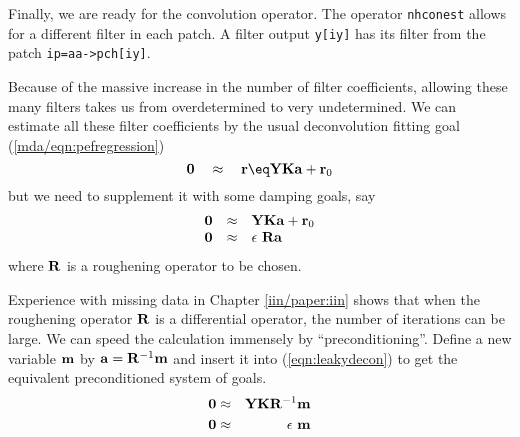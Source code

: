 \par
Finally, we are ready for the convolution operator.
The operator \texttt{nhconest} 
allows for a different filter in each patch.
A filter output \texttt{y[iy]}
has its filter from the patch \texttt{ip=aa->pch[iy]}.
\begin{comment}
The line
\texttt{t=a(ip,:)}
extracts the filter for the \texttt{ip}th patch.
If you are confused (as I am) about the difference
between \texttt{aa} and \texttt{a},
maybe now is the time to have a look at beyond Loptran
to the Fortran version.\footnote{
	http://sepwww.stanford.edu/sep/prof/gee/Lib/
	}
\end{comment}
\par
Because of the massive increase in the number of filter coefficients,
allowing these many filters
takes us from overdetermined to very undetermined.
We can estimate all these filter coefficients
by the usual deconvolution fitting goal (\ref{mda/eqn:pefregression})
\begin{equation}
\bold 0 \quad\approx\quad
\bold r \eq \bold Y \bold K \bold a +\bold r_0
\end{equation}
but we need to supplement it with some damping goals, say
\begin{equation}\begin{array}{lll}
\bold 0  &\approx&      \bold Y  \bold K \bold a  +\bold r_0
\\
\bold 0  &\approx&      \epsilon\ \bold R \bold a 
\label{eqn:leakydecon}
\end{array}
\end{equation}
where $\bold R$ is a roughening operator to be chosen.

\par
Experience with missing data in Chapter \ref{iin/paper:iin}
shows that when the roughening operator $\bold R$ is a differential operator,
the number of iterations can be large.
We can speed the calculation immensely by ``preconditioning''.
Define a new variable $\bold m$ by
$\bold a=\bold R^{-1}\bold m$
and insert it into (\ref{eqn:leakydecon}) to get
the equivalent preconditioned system of goals.
\begin{eqnarray}
\label{eqn:goodleak}
\bold 0   &\approx &   \bold Y  \bold K \bold R^{-1}\bold m  \\
\bold 0   &\approx &   \epsilon \ \bold m
\label{eqn:dumbdamp}
\end{eqnarray}

